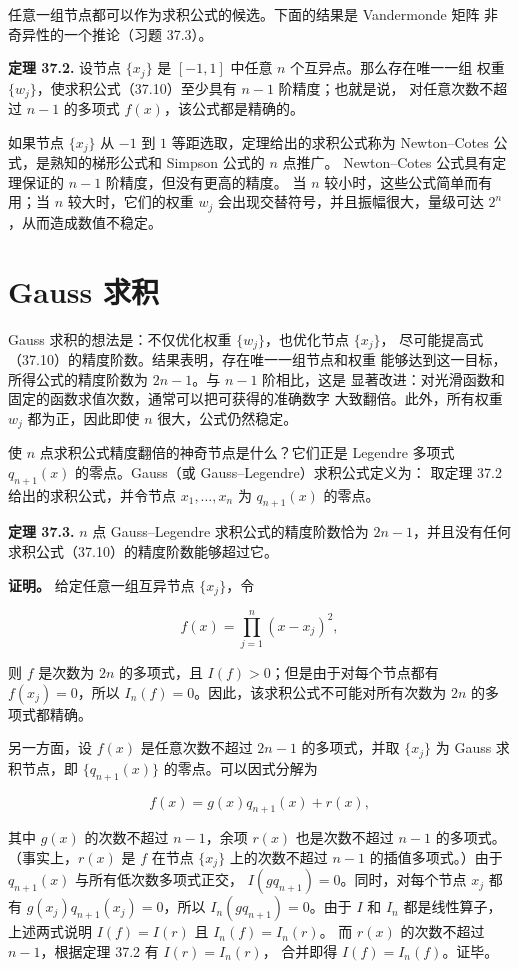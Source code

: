 \documentclass[UTF8,fontset=none,12pt]{ctexart}
\begin{document}
任意一组节点都可以作为求积公式的候选。下面的结果是 Vandermonde 矩阵
非奇异性的一个推论（习题 37.3）。

\textbf{定理 37.2.}
设节点 $\{x_j\}$ 是 $[-1,1]$ 中任意 $n$ 个互异点。那么存在唯一一组
权重 $\{w_j\}$，使求积公式（37.10）至少具有 $n-1$ 阶精度；也就是说，
对任意次数不超过 $n-1$ 的多项式 $f(x)$，该公式都是精确的。

如果节点 $\{x_j\}$ 从 $-1$ 到 $1$ 等距选取，定理给出的求积公式称为
Newton--Cotes 公式，是熟知的梯形公式和 Simpson 公式的 $n$ 点推广。
Newton--Cotes 公式具有定理保证的 $n-1$ 阶精度，但没有更高的精度。
当 $n$ 较小时，这些公式简单而有用；当 $n$ 较大时，它们的权重 $w_j$
会出现交替符号，并且振幅很大，量级可达 $2^n$，从而造成数值不稳定。

\section*{Gauss 求积}

Gauss 求积的想法是：不仅优化权重 $\{w_j\}$，也优化节点 $\{x_j\}$，
尽可能提高式（37.10）的精度阶数。结果表明，存在唯一一组节点和权重
能够达到这一目标，所得公式的精度阶数为 $2n-1$。与 $n-1$ 阶相比，这是
显著改进：对光滑函数和固定的函数求值次数，通常可以把可获得的准确数字
大致翻倍。此外，所有权重 $w_j$ 都为正，因此即使 $n$ 很大，公式仍然稳定。

使 $n$ 点求积公式精度翻倍的神奇节点是什么？它们正是 Legendre 多项式
$q_{n+1}(x)$ 的零点。Gauss（或 Gauss--Legendre）求积公式定义为：
取定理 37.2 给出的求积公式，并令节点 $x_1,\ldots,x_n$ 为 $q_{n+1}(x)$
的零点。

\textbf{定理 37.3.}
$n$ 点 Gauss--Legendre 求积公式的精度阶数恰为 $2n-1$，并且没有任何
求积公式（37.10）的精度阶数能够超过它。

\textbf{证明。}
给定任意一组互异节点 $\{x_j\}$，令

\[
f(x)=\prod_{j=1}^{n}(x-x_j)^2,
\]

则 $f$ 是次数为 $2n$ 的多项式，且 $I(f)>0$；但是由于对每个节点都有
$f(x_j)=0$，所以 $I_n(f)=0$。因此，该求积公式不可能对所有次数为 $2n$
的多项式都精确。

另一方面，设 $f(x)$ 是任意次数不超过 $2n-1$ 的多项式，并取
$\{x_j\}$ 为 Gauss 求积节点，即 $\{q_{n+1}(x)\}$ 的零点。可以因式分解为

\[
f(x)=g(x)q_{n+1}(x)+r(x),
\]

其中 $g(x)$ 的次数不超过 $n-1$，余项 $r(x)$ 也是次数不超过 $n-1$
的多项式。（事实上，$r(x)$ 是 $f$ 在节点 $\{x_j\}$ 上的次数不超过
$n-1$ 的插值多项式。）由于 $q_{n+1}(x)$ 与所有低次数多项式正交，
$I(gq_{n+1})=0$。同时，对每个节点 $x_j$ 都有
$g(x_j)q_{n+1}(x_j)=0$，所以 $I_n(gq_{n+1})=0$。由于 $I$ 和 $I_n$
都是线性算子，上述两式说明 $I(f)=I(r)$ 且 $I_n(f)=I_n(r)$。
而 $r(x)$ 的次数不超过 $n-1$，根据定理 37.2 有 $I(r)=I_n(r)$，
合并即得 $I(f)=I_n(f)$。证毕。
\end{document}
